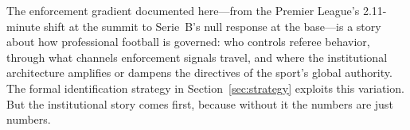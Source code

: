 \bigskip

The enforcement gradient documented here---from the Premier League's
2.11-minute shift at the summit to Serie~B's null response at the
base---is a story about how professional football is governed: who
controls referee behavior, through what channels enforcement signals
travel, and where the institutional architecture amplifies or dampens
the directives of the sport's global authority. The formal
identification strategy in Section~\ref{sec:strategy} exploits this
variation. But the institutional story comes first, because without it
the numbers are just numbers.
